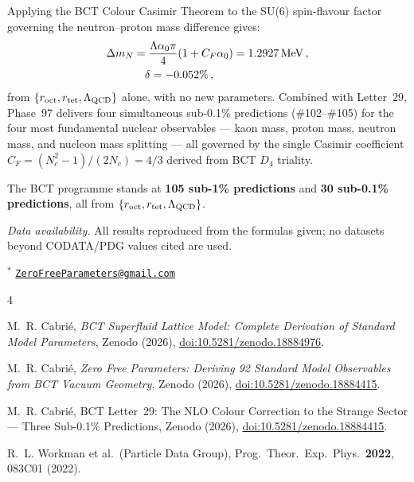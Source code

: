 \documentclass[10pt,twocolumn]{article}
\begin{document}
Applying the BCT Colour Casimir Theorem to the SU(6) spin-flavour factor governing the
neutron--proton mass difference gives:
\begin{align}
\Delta m_N &= \frac{\Lambda\alpha_0\pi}{4}(1+C_F\alpha_0)
            = 1.2927\,\text{MeV}\,,\notag\\
           &\quad\delta = -0.052\%\,,
\label{eq:concl}
\end{align}
from $\{r_{\rm oct}, r_{\rm tet}, \Lambda_{\rm QCD}\}$ alone, with no new parameters.
Combined with Letter~29, Phase~97 delivers four simultaneous sub-0.1\% predictions
(\#102--\#105) for the four most fundamental nuclear observables --- kaon mass, proton mass,
neutron mass, and nucleon mass splitting --- all governed by the single Casimir coefficient
$C_F = (N_c^2-1)/(2N_c) = 4/3$ derived from BCT $D_4$ triality.

The BCT programme stands at \textbf{105 sub-1\% predictions} and \textbf{30 sub-0.1\%
predictions}, all from $\{r_{\rm oct}, r_{\rm tet}, \Lambda_{\rm QCD}\}$.

\smallskip
\noindent\textit{Data availability.} All results reproduced from the formulas given; no datasets
beyond CODATA/PDG values cited are used.

\bigskip
\noindent$^*$ \href{mailto:ZeroFreeParameters@gmail.com}{\texttt{ZeroFreeParameters@gmail.com}}

\begin{thebibliography}{4}

M.~R. Cabri\'{e}, \textit{BCT Superfluid Lattice Model: Complete Derivation of Standard Model
Parameters}, Zenodo (2026),
\href{https://doi.org/10.5281/zenodo.18884976}{doi:10.5281/zenodo.18884976}.

M.~R. Cabri\'{e}, \textit{Zero Free Parameters: Deriving 92 Standard Model Observables from
BCT Vacuum Geometry}, Zenodo (2026),
\href{https://doi.org/10.5281/zenodo.18884415}{doi:10.5281/zenodo.18884415}.

M.~R. Cabri\'{e}, BCT Letter~29: The NLO Colour Correction to the Strange Sector ---
Three Sub-0.1\% Predictions, Zenodo (2026),
\href{https://doi.org/10.5281/zenodo.18884415}{doi:10.5281/zenodo.18884415}.

R.~L. Workman et al.\ (Particle Data Group), Prog.\ Theor.\ Exp.\ Phys.\ \textbf{2022},
083C01 (2022).

\end{thebibliography}
\end{document}
